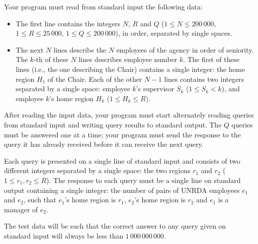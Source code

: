Your program must read from standard input the following data:
\begin{itemize}
\item The first line contains the integers $N$, $R$ and $Q$ ($1 \le N \le 200\,000$, $1 \le R \le 25\,000$, $1 \le Q \le 200\,000$), in order, separated by single spaces.
\item The next $N$ lines describe the $N$ employees of the agency in order of seniority. The $k$-th of these $N$ lines describes employee number $k$. The first of these lines (i.e., the one describing the Chair) contains a single integer: the home region $H_1$ of the Chair. Each of the other $N-1$ lines contains two integers separated by a single space: employee $k$'s supervisor $S_k$ ($1\le S_k < k$), and employee $k$'s home region $H_k$ ($1 \le H_k \le R$). 
\end{itemize}

After reading the input data, your program must start alternately reading queries from standard input and writing query results to standard output. The $Q$ queries must be answered one at a time; your program must send the response to the query it has already received before it can receive the next query.

Each query is presented on a single line of standard input and consists of two different integers separated by a single space: the two regions $r_1$ and $r_2$ ($1 \le r_1, r_2 \le R$). The response to each query must be a single line on standard output containing a single integer: the number of pairs of UNRDA employees $e_1$ and $e_2$, such that $e_1$'s home region is $r_1$, $e_2$'s home region is $r_2$ and $e_1$ is a manager of $e_2$.

The test data will be such that the correct answer to any query given on standard input
will always be less than $1\,000\,000\,000$.